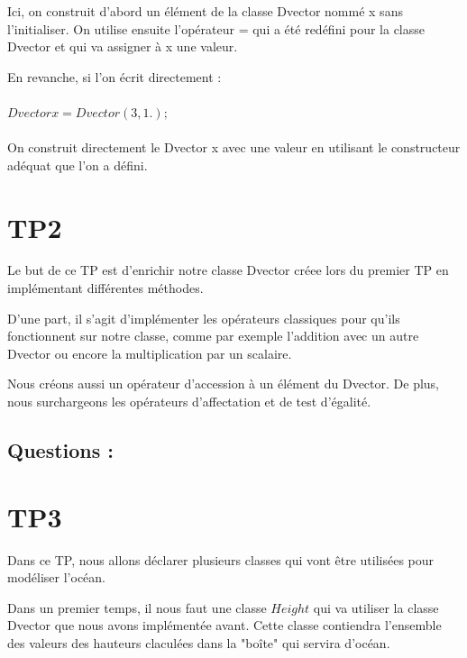 \documentclass{article}
\begin{document}
Ici, on construit d'abord un élément de la classe Dvector nommé x sans l'initialiser.
On utilise ensuite l'opérateur = qui a été redéfini pour la classe Dvector et qui va assigner à x une valeur.

En revanche, si l'on écrit directement : \\ \\ $Dvector x = Dvector(3, 1.);$ \\ \\

On construit directement le Dvector x avec une valeur en utilisant le constructeur adéquat que l'on a défini.


\vspace{1cm}

\section{TP2}

Le but de ce TP est d'enrichir notre classe Dvector créee lors du premier TP en implémentant différentes méthodes.

D'une part, il s'agit d'implémenter les opérateurs classiques pour qu'ils fonctionnent sur notre classe, comme par exemple l'addition avec un autre Dvector ou encore la multiplication par un scalaire.

Nous créons aussi un opérateur d'accession à un élément du Dvector. De plus, nous surchargeons les opérateurs d'affectation et de test d'égalité.

\vspace{0.5cm}

\subsection{Questions :}



\vspace{1cm}

\section{TP3}

Dans ce TP, nous allons déclarer plusieurs classes qui vont être utilisées pour modéliser l'océan.

Dans un premier temps, il nous faut une classe $Height$ qui va utiliser la classe Dvector que nous avons implémentée avant. Cette classe contiendra l'ensemble des valeurs des hauteurs claculées dans la "boîte" qui servira d'océan.
\end{document}
